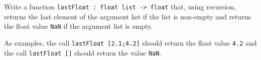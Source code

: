 Write a function
%
\lstinline{lastFloat : float list -> float}
%
that, using recursion, returns the last element of the argument list
if the list is non-empty and returns the float value \lstinline{NaN}
if the argument list is empty.

As examples, the call
%
\lstinline{lastFloat [2.1;4.2]}
%
should return the float value \lstinline{4.2} and the call
%
\lstinline{lastFloat []}
%
should return the value \lstinline{NaN}.
